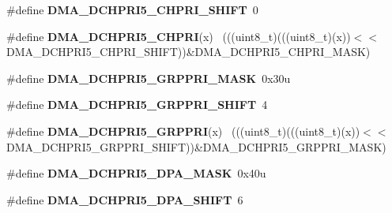 \begin{DoxyCompactItemize}
\item 
\hypertarget{group___d_m_a___register___masks_gad92d72515f8f70aeaa7035139b95021e}{}\#define {\bfseries D\+M\+A\+\_\+\+D\+C\+H\+P\+R\+I5\+\_\+\+C\+H\+P\+R\+I\+\_\+\+S\+H\+I\+F\+T}~0\label{group___d_m_a___register___masks_gad92d72515f8f70aeaa7035139b95021e}

\item 
\hypertarget{group___d_m_a___register___masks_gaa6fdb8c169e85fbc69754f93cc4428d9}{}\#define {\bfseries D\+M\+A\+\_\+\+D\+C\+H\+P\+R\+I5\+\_\+\+C\+H\+P\+R\+I}(x)                                      ~(((uint8\+\_\+t)(((uint8\+\_\+t)(x))$<$$<$D\+M\+A\+\_\+\+D\+C\+H\+P\+R\+I5\+\_\+\+C\+H\+P\+R\+I\+\_\+\+S\+H\+I\+F\+T))\&D\+M\+A\+\_\+\+D\+C\+H\+P\+R\+I5\+\_\+\+C\+H\+P\+R\+I\+\_\+\+M\+A\+S\+K)\label{group___d_m_a___register___masks_gaa6fdb8c169e85fbc69754f93cc4428d9}

\item 
\hypertarget{group___d_m_a___register___masks_ga3733a9af1b3a3bdca0e5a75d43aa9ed3}{}\#define {\bfseries D\+M\+A\+\_\+\+D\+C\+H\+P\+R\+I5\+\_\+\+G\+R\+P\+P\+R\+I\+\_\+\+M\+A\+S\+K}~0x30u\label{group___d_m_a___register___masks_ga3733a9af1b3a3bdca0e5a75d43aa9ed3}

\item 
\hypertarget{group___d_m_a___register___masks_ga26d3f5d80beae6953014d94c116ddb63}{}\#define {\bfseries D\+M\+A\+\_\+\+D\+C\+H\+P\+R\+I5\+\_\+\+G\+R\+P\+P\+R\+I\+\_\+\+S\+H\+I\+F\+T}~4\label{group___d_m_a___register___masks_ga26d3f5d80beae6953014d94c116ddb63}

\item 
\hypertarget{group___d_m_a___register___masks_ga379469de03f95eb7d75094b30677ba9d}{}\#define {\bfseries D\+M\+A\+\_\+\+D\+C\+H\+P\+R\+I5\+\_\+\+G\+R\+P\+P\+R\+I}(x)                                    ~(((uint8\+\_\+t)(((uint8\+\_\+t)(x))$<$$<$D\+M\+A\+\_\+\+D\+C\+H\+P\+R\+I5\+\_\+\+G\+R\+P\+P\+R\+I\+\_\+\+S\+H\+I\+F\+T))\&D\+M\+A\+\_\+\+D\+C\+H\+P\+R\+I5\+\_\+\+G\+R\+P\+P\+R\+I\+\_\+\+M\+A\+S\+K)\label{group___d_m_a___register___masks_ga379469de03f95eb7d75094b30677ba9d}

\item 
\hypertarget{group___d_m_a___register___masks_ga7b37f0484175d7e23fd9827d59487a9b}{}\#define {\bfseries D\+M\+A\+\_\+\+D\+C\+H\+P\+R\+I5\+\_\+\+D\+P\+A\+\_\+\+M\+A\+S\+K}~0x40u\label{group___d_m_a___register___masks_ga7b37f0484175d7e23fd9827d59487a9b}

\item 
\hypertarget{group___d_m_a___register___masks_ga7b735d044c9d0e93aeed7f848065dabd}{}\#define {\bfseries D\+M\+A\+\_\+\+D\+C\+H\+P\+R\+I5\+\_\+\+D\+P\+A\+\_\+\+S\+H\+I\+F\+T}~6\label{group___d_m_a___register___masks_ga7b735d044c9d0e93aeed7f848065dabd}


\end{DoxyCompactItemize}
